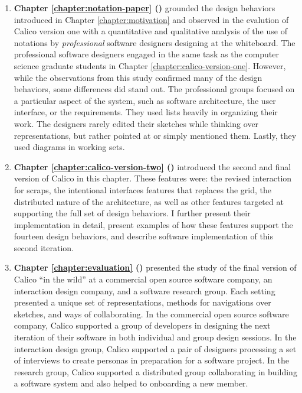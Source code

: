 \documentclass[12pt,fleqn]{ucithesis}
\begin{document}
\begin{enumerate}
   \item \textbf{Chapter \ref{chapter:notation-paper} ()} grounded the design behaviors introduced in Chapter \ref{chapter:motivation} and observed in the evalution of Calico version one with a quantitative and qualitative analysis of the use of notations by \emph{professional} software designers designing at the whiteboard. The professional software designers engaged in the same task as the computer science graduate students in Chapter \ref{chapter:calico-version-one}. However, while the observations from this study confirmed many of the design behaviors, some differences did stand out. The professional groups focused on a particular aspect of the system, such as software architecture, the user interface, or the requirements. They used lists heavily in organizing their work. The designers rarely edited their sketches while thinking over representations, but rather pointed at or simply mentioned them. Lastly, they used diagrams in working sets.

   \item \textbf{Chapter \ref{chapter:calico-version-two} ()} introduced the second and final version of Calico in this chapter. These features were: the revised interaction for scraps, the intentional interfaces features that replaces the grid, the distributed nature of the architecture, as well as other features targeted at supporting the full set of design behaviors. I further present their implementation in detail, present examples of how these features support the fourteen design behaviors, and describe software implementation of this second iteration.

   \item \textbf{Chapter \ref{chapter:evaluation} ()} presented the study of the final version of Calico ``in the wild'' at a commercial open source software company, an interaction design company, and a software research group. Each setting presented a unique set of representations, methods for navigations over sketches, and ways of collaborating. In the commercial open source software company, Calico supported a group of developers in designing the next iteration of their software in both individual and group design sessions. In the interaction design group, Calico supported a pair of designers processing a set of interviews to create personas in preparation for a software project. In the research group, Calico supported a distributed group collaborating in building a software system and also helped to onboarding a new member.


\end{enumerate}
\end{document}
